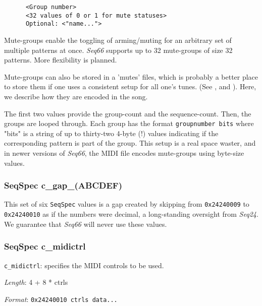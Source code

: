    \begin{verbatim}
      <Group number>
      <32 values of 0 or 1 for mute statuses>
      Optional: <"name...">
   \end{verbatim}

   Mute-groups enable the toggling of arming/muting for an arbitrary set of
   multiple patterns at once.  \textsl{Seq66} supports up to 32 mute-groups of
   size 32 patterns.  More flexibility is planned.

   Mute-groups can also be stored in a 'mutes' files, which is probably a better
   place to store them if one uses a consistent setup for all one's tunes.
   (See , and
   ).
   Here, we describe how they are encoded in the song.

   The first two values provide the group-count and the sequence-count.
   Then, the groups are looped through. Each group has the format
   \texttt{groupnumber bits} where "bits" is a string of up to thirty-two
   4-byte (!) values indicating if the corresponding pattern is part of
   the group.  This setup is a real space waster, and in newer versions of
   \textsl{Seq66}, the MIDI file encodes mute-groups using byte-size values.

\subsubsection{SeqSpec c\_gap\_(ABCDEF)}
\label{subsubsec:midi_format_track_seqspec_gap_abcdef}

   This set of six
   \texttt{SeqSpec} values is a gap created by skipping from
   \texttt{0x24240009} to \texttt{0x24240010} as if the numbers were
   decimal, a long-standing oversight from \textsl{Seq24}.
   We guarantee that \textsl{Seq66} will never use these values.

\subsubsection{SeqSpec c\_midictrl}
\label{subsubsec:midi_format_track_seqspec_midictrl}

   \begin{description}
      \item \texttt{c\_midictrl}: specifies the MIDI controls to be used.
      \item \textsl{Length}: 4 + 8 * ctrls
      \item \textsl{Format}: \texttt{0x24240010 ctrls data...}
   \end{description}
   

